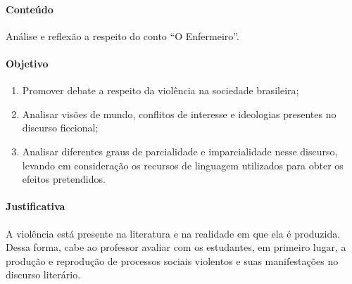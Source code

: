 \documentclass[11pt]{extarticle}
\begin{document}
\paragraph{Conteúdo} Análise e reflexão a respeito do conto ``O Enfermeiro''.

\paragraph{Objetivo}
\begin{enumerate} 
\item
Promover debate a respeito da violência na
sociedade brasileira; 
\item
Analisar visões de mundo, conflitos de
interesse e ideologias presentes no discurso ficcional; 
\item
Analisar
diferentes graus de parcialidade e imparcialidade nesse discurso,
levando em consideração os recursos de linguagem utilizados para obter
os efeitos pretendidos.
\end{enumerate}

\paragraph{Justificativa} A violência está presente na literatura e na
realidade em que ela é produzida. Dessa forma, cabe ao professor avaliar
com os estudantes, em primeiro lugar, a produção e reprodução de
processos sociais violentos e suas manifestações no discurso literário.
\end{document}
